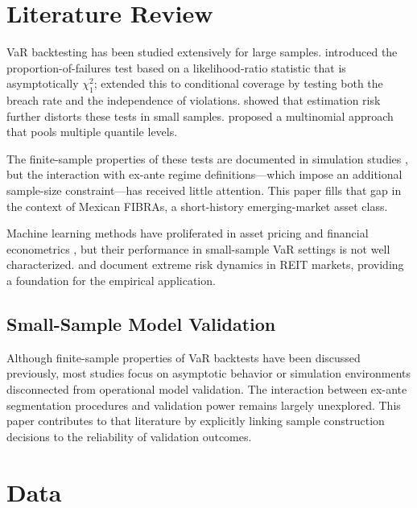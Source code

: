 \documentclass[12pt,a4paper]{article}
\begin{document}
\section{Literature Review}

VaR backtesting has been studied extensively for large samples. \citet{kupiec1995techniques} introduced the proportion-of-failures test based on a likelihood-ratio statistic that is asymptotically $\chi^2_1$; \citet{christoffersen1998evaluating} extended this to conditional coverage by testing both the breach rate and the independence of violations. \citet{escanciano2010backtesting} showed that estimation risk further distorts these tests in small samples. \citet{kratz2018multinomial} proposed a multinomial approach that pools multiple quantile levels.

The finite-sample properties of these tests are documented in simulation studies \citep{campbell2007review}, but the interaction with ex-ante regime definitions---which impose an additional sample-size constraint---has received little attention. This paper fills that gap in the context of Mexican FIBRAs, a short-history emerging-market asset class.

Machine learning methods have proliferated in asset pricing and financial econometrics \citep{gu2020empirical}, but their performance in small-sample VaR settings is not well characterized. \citet{zhou2012extreme} and \citet{cotter2006multivariate} document extreme risk dynamics in REIT markets, providing a foundation for the empirical application.

\subsection{Small-Sample Model Validation}

Although finite-sample properties of VaR backtests have been discussed previously, most studies focus on asymptotic behavior or simulation environments disconnected from operational model validation. The interaction between ex-ante segmentation procedures and validation power remains largely unexplored. This paper contributes to that literature by explicitly linking sample construction decisions to the reliability of validation outcomes.

\section{Data}
\end{document}
